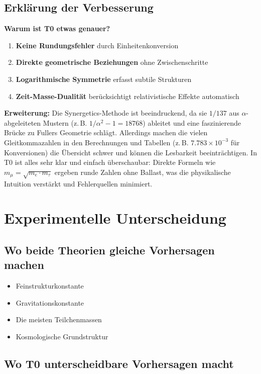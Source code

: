 	\subsection{Erklärung der Verbesserung}
	
	\textbf{Warum ist T0 etwas genauer?}
	
	\begin{enumerate}
		\item \textbf{Keine Rundungsfehler} durch Einheitenkonversion
		\item \textbf{Direkte geometrische Beziehungen} ohne Zwischenschritte
		\item \textbf{Logarithmische Symmetrie} erfasst subtile Strukturen
		\item \textbf{Zeit-Masse-Dualität} berücksichtigt relativistische Effekte automatisch
	\end{enumerate}
	
	\textbf{Erweiterung:} Die Synergetics-Methode ist beeindruckend, da sie $1/137$ aus $\alpha$-abgeleiteten Mustern (z.\,B. $1/\alpha^2 - 1 = 18768$) ableitet und eine faszinierende Brücke zu Fullers Geometrie schlägt. Allerdings machen die vielen Gleitkommazahlen in den Berechnungen und Tabellen (z.\,B. $7.783 \times 10^{-3}$ für Konversionen) die Übersicht schwer und können die Lesbarkeit beeinträchtigen. In T0 ist alles sehr klar und einfach überschaubar: Direkte Formeln wie $m_\mu = \sqrt{m_e \cdot m_\tau}$ ergeben runde Zahlen ohne Ballast, was die physikalische Intuition verstärkt und Fehlerquellen minimiert.
	
	\section{Experimentelle Unterscheidung}
	
	\subsection{Wo beide Theorien gleiche Vorhersagen machen}
	
	\begin{itemize}
		\item Feinstrukturkonstante
		\item Gravitationskonstante
		\item Die meisten Teilchenmassen
		\item Kosmologische Grundstruktur
	\end{itemize}
	
	\subsection{Wo T0 unterscheidbare Vorhersagen macht}
	
